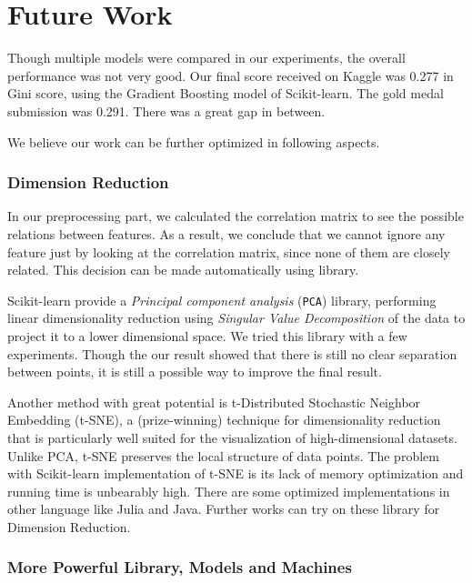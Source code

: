 \documentclass{standalone}
\begin{document}
\section{Future Work}

Though multiple models were compared in our experiments, the overall performance was not very good.
Our final score received on Kaggle was 0.277 in Gini score, using the Gradient Boosting model of Scikit-learn. The gold medal submission was 0.291. There was a great gap in between.

We believe our work can be further optimized in following aspects.

\subsubsection{Dimension Reduction}

In our preprocessing part, we calculated the correlation matrix to see the possible relations between features. As a result, we conclude that we cannot ignore any feature just by looking at the correlation matrix, since none of them are closely related. This decision can be made automatically using library.

Scikit-learn provide a \emph{Principal component analysis} (\verb|PCA|) library, performing linear dimensionality reduction using \emph{Singular Value Decomposition} of the data to project it to a lower dimensional space. We tried this library with a few experiments. Though the our result showed that there is still no clear separation between points, it is still a possible way to improve the final result.

Another method with great potential is t-Distributed Stochastic Neighbor Embedding (t-SNE)\cite{van2014accelerating}, a (prize-winning) technique for dimensionality reduction that is particularly well suited for the visualization of high-dimensional datasets\cite{tsne}. Unlike PCA, t-SNE preserves the local structure of data points.
The problem with Scikit-learn implementation of t-SNE is its lack of memory optimization and running time is unbearably high. There are some optimized implementations in other language like Julia\cite{tsne:julia} and Java\cite{tsne:java}. Further works can try on these library for Dimension Reduction.

\subsubsection{More Powerful Library, Models and Machines}
\end{document}
